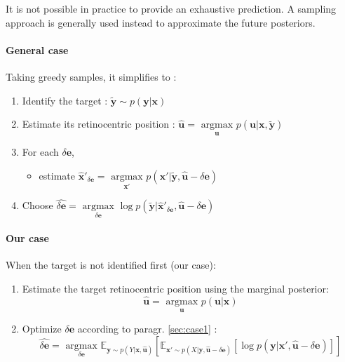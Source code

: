 It is not possible in practice to provide an exhaustive prediction. A sampling approach is generally used instead to approximate the future posteriors.

\paragraph{General case}
Taking greedy samples, it simplifies to :
\begin{enumerate}
	\item Identify the target :
$\tilde{\boldsymbol{y}} \sim  p(\boldsymbol{y}|\boldsymbol{x})$
\item Estimate its retinocentric position : 
$\hat{\boldsymbol{u}} = \underset{\boldsymbol{u}}{\text{ argmax }} p(\boldsymbol{u}|\boldsymbol{x}, \tilde{\boldsymbol{y}})$
\item For each $\delta\boldsymbol{e}$, 
\begin{itemize}
	\item estimate
	$\hat{\boldsymbol{x}}'_{\delta\boldsymbol{e}} = \underset{\boldsymbol{x}'}{\text{ argmax }} p(\boldsymbol{x}'|\tilde{\boldsymbol{y}}, \hat{\boldsymbol{u}}-\delta\boldsymbol{e})$
\end{itemize}
\item
Choose $\widehat{\delta\boldsymbol{e}} = \underset{\delta\boldsymbol{e}}{\text{ argmax }} \log p(\tilde{\boldsymbol{y}}|\hat{\boldsymbol{x}}'_{\delta\boldsymbol{e}}, \hat{\boldsymbol{u}} - \delta\boldsymbol{e})$
\end{enumerate}

\paragraph{Our case}
When the target is not identified first (our case):
\begin{enumerate}
	\item Estimate the target retinocentric position using the marginal posterior: 
	$$\hat{\boldsymbol{u}} = \underset{\boldsymbol{u}}{\text{ argmax }} p(\boldsymbol{u}|\boldsymbol{x})$$
	\item Optimize $\delta\boldsymbol{e}$ according to paragr. \ref{sec:case1} : 
	$$\widehat{\delta\boldsymbol{e}} = \underset{\delta\boldsymbol{e}}{\text{ argmax }} 
	\mathbb{E}_{\boldsymbol{y}\sim p(Y|\boldsymbol{x}, \hat{\boldsymbol{u}})}  
	\left[\mathbb{E}_{ \boldsymbol{x}' \sim p(X|\boldsymbol{y}, \hat{\boldsymbol{u}} - \delta\boldsymbol{e})}
	\left[\log p(\boldsymbol{y}|\boldsymbol{x}', \hat{\boldsymbol{u}}- \delta\boldsymbol{e})\right]\right]$$
\end{enumerate}

